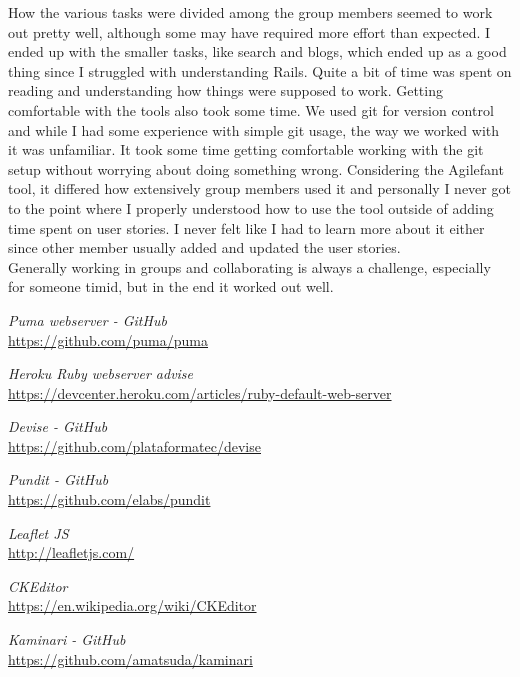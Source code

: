 \documentclass[a4paper]{article}
\begin{document}
\noindent
How the various tasks were divided among the group members seemed to work out pretty well, although some may have required more effort than expected. I ended up with the smaller tasks, like search and blogs, which ended up as a good thing since I struggled with understanding Rails. Quite a bit of time was spent on reading and understanding how things were supposed to work. Getting comfortable with the tools also took some time. We used git for version control and while I had some experience with simple git usage, the way we worked with it was unfamiliar. It took some time getting comfortable working with the git setup without worrying about doing something wrong. Considering the Agilefant tool, it differed how extensively group members used it and personally I never got to the point where I properly understood how to use the tool outside of adding time spent on user stories. I never felt like I had to learn more about it either since other member usually added and updated the user stories.\\

\noindent
Generally working in groups and collaborating is always a challenge, especially for someone timid, but in the end it worked out well.


\begin{thebibliography}{9}

\emph{Puma webserver - GitHub}\\
\url{https://github.com/puma/puma}

\emph{Heroku Ruby webserver advise}\\
\url {https://devcenter.heroku.com/articles/ruby-default-web-server}

\emph{Devise - GitHub}\\
\url{https://github.com/plataformatec/devise}

\emph{Pundit - GitHub}\\
\url{https://github.com/elabs/pundit}

\emph{Leaflet JS}\\
\url{http://leafletjs.com/}

\emph{CKEditor}\\
\url{https://en.wikipedia.org/wiki/CKEditor}

\emph{Kaminari - GitHub}\\
\url{https://github.com/amatsuda/kaminari}

\end{thebibliography}
\end{document}
